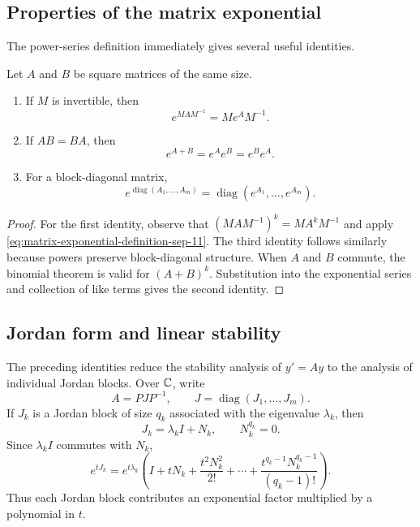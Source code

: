 \subsection{Properties of the matrix exponential}

The power-series definition immediately gives several useful
identities.

\begin{proposition}\label{prop:matrix-exponential-properties-sep-11}
  Let \(A\) and \(B\) be square matrices of the same size.
  \begin{enumerate}[label=\textup{(\roman*)}]
    \item If \(M\) is invertible, then
      \[
        e^{MAM^{-1}}=Me^AM^{-1}.
      \]
    \item If \(AB=BA\), then
      \[
        e^{A+B}=e^Ae^B=e^Be^A.
      \]
    \item For a block-diagonal matrix,
      \[
        e^{\operatorname{diag}(A_1,\ldots,A_m)}
        =\operatorname{diag}(e^{A_1},\ldots,e^{A_m}).
      \]
  \end{enumerate}
\end{proposition}

\begin{proof}
  For the first identity, observe that
  \((MAM^{-1})^k=MA^kM^{-1}\) and apply
  \eqref{eq:matrix-exponential-definition-sep-11}. The third identity
  follows similarly because powers preserve block-diagonal structure.
  When \(A\) and \(B\) commute, the binomial theorem is valid for
  \((A+B)^k\). Substitution into the exponential series and collection
  of like terms gives the second identity.
\end{proof}

\subsection{Jordan form and linear stability}

The preceding identities reduce the stability analysis of \(y'=Ay\)
to the analysis of individual Jordan blocks. Over \(\mathbb{C}\), write
\begin{equation}\label{eq:jordan-decomposition-sep-11}
  A=PJP^{-1},
  \qquad
  J=\operatorname{diag}(J_1,\ldots,J_m).
\end{equation}
If \(J_k\) is a Jordan block of size \(q_k\) associated with the
eigenvalue \(\lambda_k\), then
\[
  J_k=\lambda_k I+N_k,
  \qquad
  N_k^{q_k}=0.
\]
Since \(\lambda_kI\) commutes with \(N_k\),
\begin{equation}\label{eq:jordan-block-exponential-sep-11}
  e^{tJ_k}
  =e^{t\lambda_k}
   \left(
     I+tN_k+\frac{t^2N_k^2}{2!}+\cdots
     +\frac{t^{q_k-1}N_k^{q_k-1}}{(q_k-1)!}
   \right).
\end{equation}
Thus each Jordan block contributes an exponential factor multiplied by
a polynomial in \(t\).

